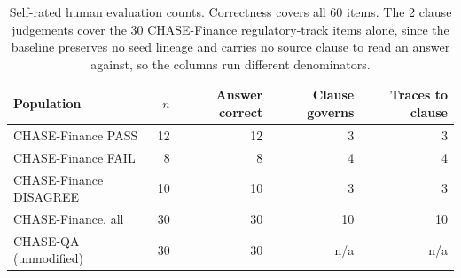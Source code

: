\begin{table}[h]
\centering
\begin{tabular}{lrrrr}
\toprule
Population & $n$ & Answer correct & Clause governs & Traces to clause \\
\midrule
CHASE-Finance PASS & 12 & 12 & 3 & 3 \\
CHASE-Finance FAIL & 8 & 8 & 4 & 4 \\
CHASE-Finance DISAGREE & 10 & 10 & 3 & 3 \\
\midrule
CHASE-Finance, all & 30 & 30 & 10 & 10 \\
CHASE-QA (unmodified) & 30 & 30 & n/a & n/a \\
\bottomrule
\end{tabular}
\caption{Self-rated human evaluation counts. Correctness covers all 60 items. The 2 clause judgements cover the 30 CHASE-Finance regulatory-track items alone, since the baseline preserves no seed lineage and carries no source clause to read an answer against, so the columns run different denominators.}
\label{tab:human-eval}
\end{table}
